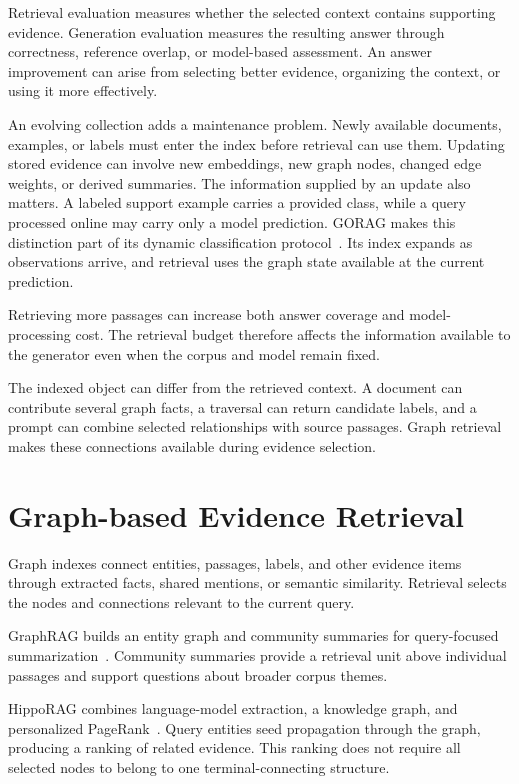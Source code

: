 Retrieval evaluation measures whether the selected context contains supporting evidence. Generation evaluation measures the resulting answer through correctness, reference overlap, or model-based assessment. An answer improvement can arise from selecting better evidence, organizing the context, or using it more effectively.

An evolving collection adds a maintenance problem. Newly available documents, examples, or labels must enter the index before retrieval can use them. Updating stored evidence can involve new embeddings, new graph nodes, changed edge weights, or derived summaries. The information supplied by an update also matters. A labeled support example carries a provided class, while a query processed online may carry only a model prediction. GORAG makes this distinction part of its dynamic classification protocol~\cite{bg-gorag}. Its index expands as observations arrive, and retrieval uses the graph state available at the current prediction.

Retrieving more passages can increase both answer coverage and model-processing cost. The retrieval budget therefore affects the information available to the generator even when the corpus and model remain fixed.

The indexed object can differ from the retrieved context. A document can contribute several graph facts, a traversal can return candidate labels, and a prompt can combine selected relationships with source passages. Graph retrieval makes these connections available during evidence selection.

\section{Graph-based Evidence Retrieval}
\label{sec:background:graph-retrieval}

Graph indexes connect entities, passages, labels, and other evidence items through extracted facts, shared mentions, or semantic similarity. Retrieval selects the nodes and connections relevant to the current query.

GraphRAG builds an entity graph and community summaries for query-focused summarization~\cite{bg-graphrag}. Community summaries provide a retrieval unit above individual passages and support questions about broader corpus themes.

HippoRAG combines language-model extraction, a knowledge graph, and personalized PageRank~\cite{bg-hipporag}. Query entities seed propagation through the graph, producing a ranking of related evidence. This ranking does not require all selected nodes to belong to one terminal-connecting structure.

